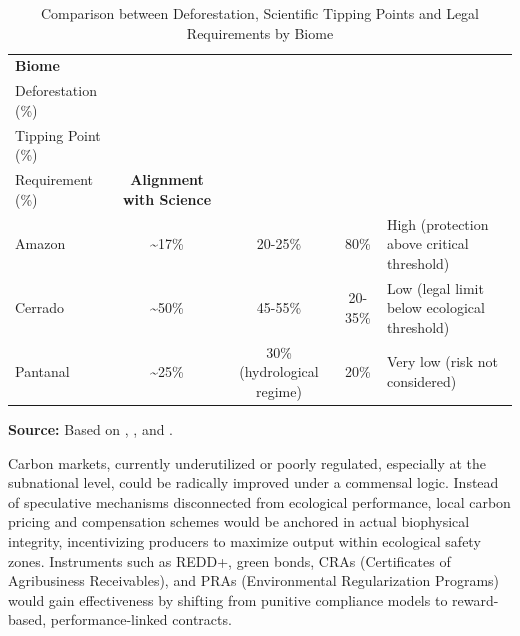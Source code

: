 \begin{table}[H]
\centering
\caption{Comparison between Deforestation, Scientific Tipping Points and Legal Requirements by Biome}
\label{tab:biomes_threshold}
\footnotesize
\renewcommand{\arraystretch}{1.3}
\begin{tabularx}{\textwidth}{|l|c|c|c|X|}
\hline
\textbf{Biome} & 
\textbf{\begin{tabular}[c]{@{}c@{}}Cumulative\\ Deforestation (\%)\end{tabular}} & 
\textbf{\begin{tabular}[c]{@{}c@{}}Scientific\\ Tipping Point (\%)\end{tabular}} & 
\textbf{\begin{tabular}[c]{@{}c@{}}Legal\\ Requirement (\%)\end{tabular}} & 
\textbf{Alignment with Science} \\ 
\hline

Amazon & 
\textasciitilde17\% & 
20-25\% & 
80\% & 
High (protection above critical threshold) \\ 
\hline

Cerrado & 
\textasciitilde50\% & 
45-55\% & 
20-35\% & 
Low (legal limit below ecological threshold) \\ 
\hline

Pantanal & 
\textasciitilde25\% & 
30\% (hydrological regime) & 
20\% & 
Very low (risk not considered) \\ 
\hline

\end{tabularx}

\vspace{0.1em}
\begin{flushleft}
\footnotesize
\textbf{Source:} Based on , , and .
\end{flushleft}

\end{table}

Carbon markets, currently underutilized or poorly regulated, especially at the subnational level, could be radically improved under a commensal logic. Instead of speculative mechanisms disconnected from ecological performance, local carbon pricing and compensation schemes would be anchored in actual biophysical integrity, incentivizing producers to maximize output within ecological safety zones. Instruments such as REDD+, green bonds, CRAs (Certificates of Agribusiness Receivables), and PRAs (Environmental Regularization Programs) would gain effectiveness by shifting from punitive compliance models to reward-based, performance-linked contracts.

